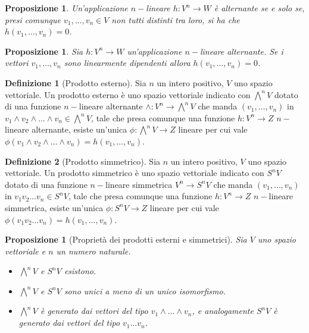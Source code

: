 \documentclass[11pt]{article}
\theoremstyle{plain}
\newtheorem{prop}[thm]{Proposizione}
\theoremstyle{definition}
\newtheorem{defn}{Definizione}[section]
\theoremstyle{remark}
\begin{document}
\begin{prop}
  Un'applicazione $n-$lineare $h: V^n \to W$ è alternante se e solo se, presi comunque $v_1,\dots,v_n\in V$
  non tutti distinti tra loro, si ha che $h(v_1,\dots,v_n)=0$.
\end{prop}

\begin{prop}
  Sia $h: V^n \to W$ un'applicazione $n-$lineare alternante. Se i vettori $v_1,\dots,v_n$ sono linearmente dipendenti allora
  $h(v_1,\dots,v_n)=0$.
\end{prop}


\begin{defn}[Prodotto esterno]
Sia $n$ un intero positivo, $V$ uno spazio vettoriale. Un prodotto esterno è uno spazio vettoriale indicato con $\bigwedge^n V$
dotato di una funzione $n-$lineare alternante $\wedge: V^n \to \bigwedge^n V$ che manda $(v_1,\ldots,v_n)$ in 
$v_1\wedge v_2\wedge\ldots\wedge v_n \in \bigwedge^n V$, tale che presa comunque una funzione $h: V^n \to Z$ $n-$lineare alternante, 
esiste un'unica $\phi: \bigwedge^n V \to Z $ lineare per cui vale $\phi(v_1\wedge v_2\wedge \ldots \wedge v_n)=h(v_1,\ldots,v_n)$.
\label{defn:prodotto esterno}
\end{defn}

\begin{defn}[Prodotto simmetrico]
Sia $n$ un intero positivo, $V$ uno spazio vettoriale. Un prodotto simmetrico è uno spazio vettoriale indicato con $S^n V$
dotato di una funzione $n-$lineare simmetrica $V^n \to S^n V$ che manda $(v_1,\ldots,v_n)$ in 
$v_1 v_2\ldots v_n \in S^n V$, tale che presa comunque una funzione $h: V^n \to Z$ $n-$lineare simmetrica, 
esiste un'unica $\phi: S^n V \to Z $ lineare per cui vale $\phi(v_1 v_2 \ldots v_n)=h(v_1,\ldots,v_n)$.
\label{defn:prodotto simmetrico}
\end{defn}


\begin{prop}[Proprietà dei prodotti esterni e simmetrici]
Sia $V$ uno spazio vettoriale e $n$ un numero naturale.
\begin{itemize}
\item $\bigwedge^nV$ e $S^nV$ esistono.
\item $\bigwedge^nV$ e $S^nV$ sono unici a meno di un unico isomorfismo.
\item $\bigwedge^nV$ è generato dai vettori del tipo $v_1\wedge \dots \wedge v_n$, e analogamente 
      $S^nV$ è generato dai vettori del tipo $v_1\dots v_n$.
\end{itemize}
\end{prop}
\end{document}
